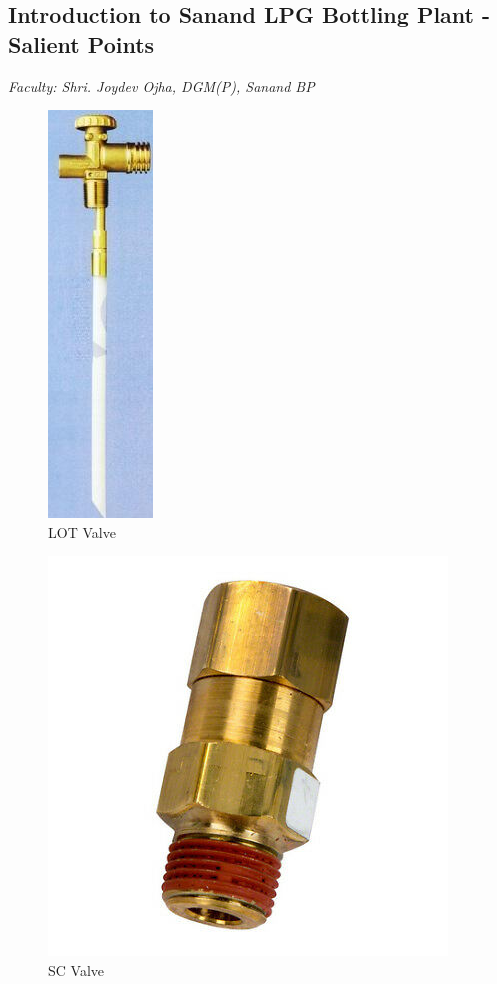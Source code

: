 \documentclass{report}
\begin{document}
	\subsection{Introduction to Sanand LPG Bottling Plant - Salient Points}
	\textit{Faculty: Shri. Joydev Ojha, DGM(P), Sanand BP}
	\begin{figure}
		\centering
		\includegraphics{lot_valve}
		\caption{LOT Valve}
		\label{lot_valve}
	\end{figure}
	\begin{figure}
		\centering
		\includegraphics{sc_valve}
		\caption{SC Valve}
		\label{sc_valve}
	\end{figure}
\end{document}
